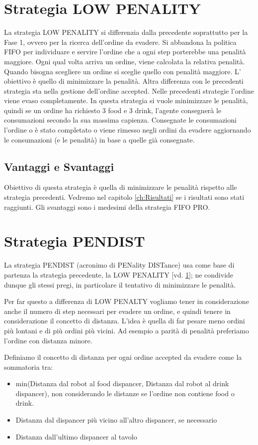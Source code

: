 \section{Strategia LOW PENALITY}
\label{sec:lowpen}
La strategia LOW PENALITY si differenzia dalla precedente soprattutto per la Fase 1, ovvero per la ricerca dell'ordine da evadere. Si abbandona la politica FIFO per individuare e servire l'ordine che a ogni step porterebbe una penalità maggiore. Ogni qual volta arriva un ordine, viene calcolata la relativa penalità. Quando bisogna scegliere un ordine si sceglie quello con penalità maggiore. L' obiettivo è quello di minimizzare la penalità.
Altra differenza con le precedenti strategia sta nella gestione dell'ordine accepted. Nelle precedenti strategie l'ordine viene evaso completamente. In questa strategia si vuole minimizzare le penalità, quindi se un ordine ha richiesto 3 food e 3 drink, l'agente consegnerà le consumazioni secondo la sua massima capienza. Consegnate le consumazioni l'ordine o è stato completato o viene rimesso negli ordini da evadere aggiornando le consumazioni (e le penalità) in base a quelle già consegnate.

\subsection{Vantaggi e Svantaggi}
Obiettivo di questa strategia è quella di minimizzare le penalità rispetto alle strategia precedenti. Vedremo nel capitolo \ref{ch:Risultati}  se i risultati sono stati raggiunti. Gli svantaggi sono i medesimi della strategia FIFO PRO.

\section{Strategia PENDIST}
La strategia PENDIST (acronimo di PENality DISTance) usa come base di partenza la strategia precedente, la LOW PENALITY [vd. \ref{sec:lowpen}]; ne condivide dunque gli stessi pregi, in particolare il tentativo di minimizzare le penalità.

Per far questo a differenza di LOW PENALTY vogliamo tener in considerazione anche il numero di step necessari per evadere un ordine, e quindi tenere in considerazione il concetto di distanza. L'idea è quella di far pesare meno ordini più lontani e di più ordini più vicini. Ad esempio a parità di penalità preferiamo l'ordine con distanza minore.

Definiamo il concetto di distanza per ogni ordine accepted da evadere come la sommatoria tra:
\begin{itemize}
    \item min(Distanza dal robot al food dispancer, Distanza dal robot al drink dispancer), non considerando le distanze se l'ordine non contiene food o drink.
    \item Distanza dal dispancer più vicino all'altro dispancer, se necessario
    \item Distanza dall'ultimo dispancer al tavolo
\end{itemize}

